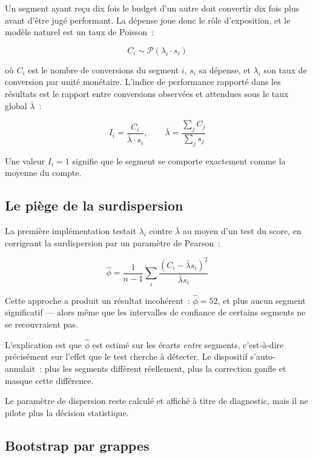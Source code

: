 \documentclass[11pt,a4paper]{article}
\begin{document}
Un segment ayant reçu dix fois le budget d'un autre doit convertir dix fois plus
avant d'être jugé performant. La dépense joue donc le rôle d'exposition, et le
modèle naturel est un taux de Poisson~:

\begin{equation}
  C_i \sim \mathcal{P}\!\left(\lambda_i \cdot s_i\right)
\end{equation}

où $C_i$ est le nombre de conversions du segment $i$, $s_i$ sa dépense, et
$\lambda_i$ son taux de conversion par unité monétaire. L'indice de performance
rapporté dans les résultats est le rapport entre conversions observées et
attendues sous le taux global $\bar{\lambda}$~:

\begin{equation}
  I_i = \frac{C_i}{\bar{\lambda} \cdot s_i},
  \qquad
  \bar{\lambda} = \frac{\sum_j C_j}{\sum_j s_j}
\end{equation}

Une valeur $I_i = 1$ signifie que le segment se comporte exactement comme la
moyenne du compte.

\subsection{Le piège de la surdispersion}

La première implémentation testait $\lambda_i$ contre $\bar{\lambda}$ au moyen
d'un test du score, en corrigeant la surdispersion par un paramètre de Pearson~:

\begin{equation}
  \hat{\phi} = \frac{1}{n-1}\sum_{i}
  \frac{\left(C_i - \bar{\lambda} s_i\right)^2}{\bar{\lambda} s_i}
\end{equation}

Cette approche a produit un résultat incohérent~: $\hat{\phi} = 52$, et plus
aucun segment significatif --- alors même que les intervalles de confiance de
certains segments ne se recouvraient pas.

L'explication est que $\hat{\phi}$ est estimé sur les écarts \emph{entre}
segments, c'est-à-dire précisément sur l'effet que le test cherche à détecter.
Le dispositif s'auto-annulait~: plus les segments diffèrent réellement, plus la
correction gonfle et masque cette différence.

Le paramètre de dispersion reste calculé et affiché à titre de diagnostic, mais
il ne pilote plus la décision statistique.

\subsection{Bootstrap par grappes}
\end{document}
